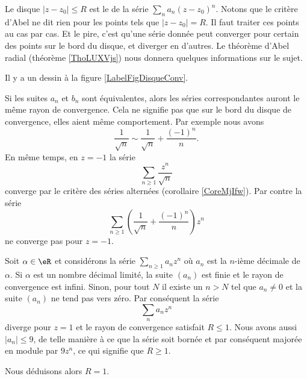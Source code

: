 Le disque $| z-z_0 |\leq R$ est le  de la série \( \sum_n a_n(z-z_0)^n\). Notons que le critère d'Abel ne dit rien pour les points tels que $| z-z_0 |=R$. Il faut traiter ces points au cas par cas. Et le pire, c'est qu'une série donnée peut converger pour certain des points sur le bord du disque, et diverger en d'autres. Le théorème d'Abel radial (théorème \ref{ThoLUXVjs}) nous donnera quelques informations sur le sujet.

Il y a un dessin à la figure \ref{LabelFigDisqueConv}.
\newcommand{\CaptionFigDisqueConv}{À l'intérieur du disque de convergence, la convergence est absolue. En dehors, la série diverge. Sur le cercle proprement dit, tout peut arriver.}


Si les suites \( a_n\) et \( b_n\) sont équivalentes, alors les séries correspondantes auront le même rayon de convergence. Cela ne signifie pas que sur le bord du disque de convergence, elles aient même comportement. Par exemple nous avons
\begin{equation}
    \frac{1}{ \sqrt{n} }\sim \frac{1}{ \sqrt{n} }+\frac{ (-1)^n }{ n }.
\end{equation}
En même temps, en \( z=-1\) la série 
\begin{equation}
    \sum_{n\geq 1}\frac{ z^n }{ \sqrt{n} }
\end{equation}
converge par le critère des séries alternées (corollaire \ref{CoreMjIfw}). Par contre la série
\begin{equation}
    \sum_{n\geq 1}\left( \frac{1}{ \sqrt{n} }+\frac{ (-1)^n }{ n } \right)z^n
\end{equation}
ne converge pas pour \( z=-1\).

\begin{example}
    Soit \( \alpha\in \eR\) et considérons la série \( \sum_{n\geq 1}a_nz^n\) où \( a_n\) est la \( n\)-ième décimale de \( \alpha\). Si \( \alpha\) est un nombre décimal limité, la suite \( (a_n)\) est finie et le rayon de convergence est infini. Sinon, pour tout \( N\) il existe un \( n>N\) tel que \( a_n\neq 0\) et la suite \( (a_n)\) ne tend pas vers zéro. Par conséquent la série
    \begin{equation}
        \sum_{n}a_nz^n
    \end{equation}
    diverge pour \( z=1\) et le rayon de convergence satisfait \( R\leq 1\). Nous avons aussi \( | a_n |\leq 9\), de telle manière à ce que la série soit bornée et par conséquent majorée en module par \( 9z^n\), ce qui signifie que \( R\geq 1\). 

    Nous déduisons alors \( R=1\).
\end{example}

